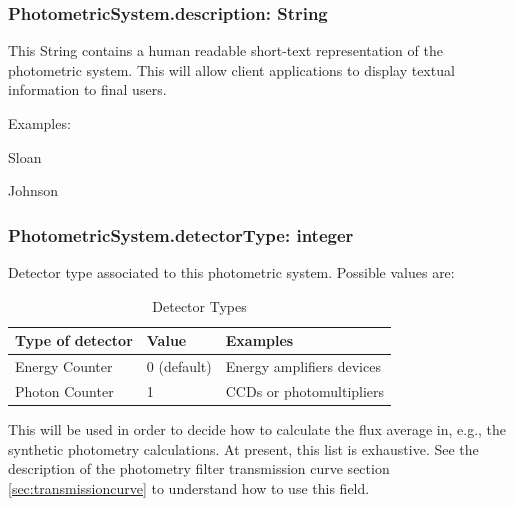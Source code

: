 \documentclass[11pt,a4paper]{ivoa}
\begin{document}
\subsubsection{PhotometricSystem.description: String}
This String contains a human readable short-text representation of the
photometric system. This will allow client applications to display
textual information to final users.
\par

Examples:


Sloan \par
Johnson
\bigskip



\subsubsection{PhotometricSystem.detectorType: integer}
Detector type associated to this photometric system. Possible
values are:




\begin{table}[ht]
 			\centering
\begin{tabular}{p{2.42in}p{0.8in}p{1.55in}}
\hline
\multicolumn{1}{|p{2.42in}}{Type of detector} &
\multicolumn{1}{|p{0.8in}}{Value} &
\multicolumn{1}{|p{1.55in}|}{Examples} \\
\hline
\multicolumn{1}{|p{2.42in}}{Energy Counter} &
\multicolumn{1}{|p{0.8in}}{0 (default)} &
\multicolumn{1}{|p{1.55in}|}{Energy amplifiers devices} \\
\hline
\multicolumn{1}{|p{2.42in}}{Photon Counter} &
\multicolumn{1}{|p{0.8in}}{1} &
\multicolumn{1}{|p{1.55in}|}{CCDs or photomultipliers} \\
\hline
\end{tabular}
\caption{Detector Types}
 \end{table}



This will be used in order to decide how to calculate the
flux average in, e.g., the synthetic photometry calculations.
At present, this list is exhaustive.
See the description of the photometry filter
transmission curve section \ref{sec:transmissioncurve} to understand how to use this field.
\par
\end{document}
